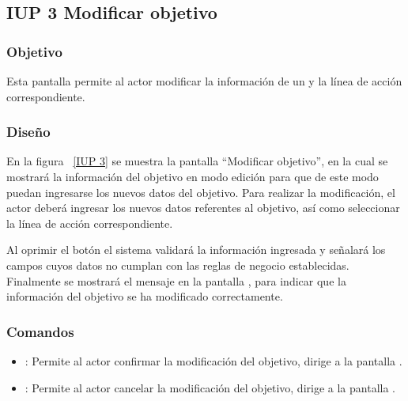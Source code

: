 \subsection{IUP 3 Modificar objetivo}

\subsubsection{Objetivo}
   
   Esta pantalla permite al actor modificar la información de un  y la línea de acción correspondiente. 
      

	
\subsubsection{Diseño}

  En la figura ~\ref{IUP 3} se muestra la pantalla ``Modificar objetivo'', en la cual se mostrará la información del objetivo en modo edición para que
  de este modo puedan ingresarse los nuevos datos del objetivo.
  Para realizar la modificación, el actor deberá ingresar los nuevos datos referentes al objetivo, así como seleccionar la línea de acción correspondiente.\\
  

  Al oprimir el botón  el sistema validará la información ingresada y señalará los campos cuyos datos no cumplan con las reglas de negocio establecidas.\\
  
  Finalmente se mostrará el mensaje  en la pantalla , para indicar que la información del objetivo
  se ha modificado correctamente.
    
\subsubsection{Comandos}
\begin{itemize}
	\item {}: Permite al actor confirmar la modificación del objetivo, dirige a la pantalla .
	\item {}: Permite al actor cancelar la modificación del objetivo, dirige a la pantalla .
\end{itemize}


